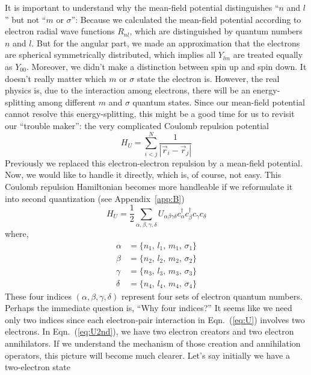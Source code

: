 It is important to understand why the mean-field
potential distinguishes ``$n$ and $l$'' but not ``$m$ or $\sigma$'': Because we calculated
the mean-field potential according to electron radial wave functions $R_{nl}$, which
are distinguished by quantum numbers $n$ and $l$. But for the angular part,
we made an approximation that the electrons are spherical symmetrically
distributed, which implies all $Y_{lm}$ are treated equally as $Y_{00}$.
Moreover, we didn't make a distinction between spin up and spin down.
It doesn't really matter which $m$ or $\sigma$ state the electron is.
However, the real physics is, due to the interaction among electrons,
there will be an energy-splitting among different $m$ and $\sigma$ quantum states.
Since our mean-field potential cannot resolve this energy-splitting,
this might be a good time for us to revisit our ``trouble maker'':
the very complicated Coulomb repulsion potential
\begin{equation} \label{eq:U}
H_U = \sum_{i<j}^N \frac{1}{|\vec{r}_i - \vec{r}_j|}
\end{equation}
%
Previously we replaced this electron-electron repulsion by a mean-field potential.
Now, we would like to handle it directly, which is, of course, not easy.
This Coulomb repulsion Hamiltonian becomes more handleable if we reformulate it
into second quantization (see Appendix~\ref{app:B})
\begin{equation} \label{eq:U2nd}
H_U = \frac{1}{2} \sum_{\alpha,\beta,\gamma,\delta} U_{\alpha\beta\gamma\delta} c_\alpha^\dag c_\beta^\dag c_\gamma c_\delta
\end{equation}
where,
\begin{align}
\alpha & = \{n_1,\,l_1,\,m_1,\,\sigma_1\} \nonumber \\
\beta  & = \{n_2,\,l_2,\,m_2,\,\sigma_2\} \nonumber \\
\gamma & = \{n_3,\,l_3,\,m_3,\,\sigma_3\} \nonumber \\
\delta & = \{n_4,\,l_4,\,m_4,\,\sigma_4\} \nonumber
\end{align}
%
These four indices $(\alpha,\beta,\gamma,\delta)$ represent four sets of electron
quantum numbers. Perhaps the immediate question is,
``Why four indices?'' It seems like we need only two indices since each electron-pair
interaction in Eqn.~(\ref{eq:U}) involves two electrons.
In Eqn.~(\ref{eq:U2nd}), we have two electron creators and two electron annihilators.
If we understand the mechanism of those creation and annihilation operators,
this picture will become much clearer. Let's say initially we have a two-electron state
